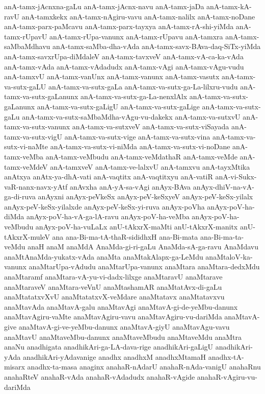 {anA-tamx-jAcnxna-gaLu
anA-tamx-jAcnx-navu
anA-tamx-jaDa
anA-tamx-kA-ravU
anA-tamxkekx
anA-tamx-nAgiru-vavu
anA-tamx-nalilx
anA-tamx-noDane
anA-tamx-parx-paMcavu
anA-tamx-parx-tayxya
anA-tamx-rA-shi-yiMda
anA-tamx-rUpavU
anA-tamx-rUpa-vanunx
anA-tamx-rUpavu
anA-tamxra
anA-tamx-saMbaMdhavu
anA-tamx-saMba-dha-vAda
anA-tamx-savx-BAva-daq-SiTx-yiMda
anA-tamx-savxrUpa-diMdaleV
anA-tamx-tavxveV
anA-tamx-vA-ca-ka-vAda
anA-tamx-vAda
anA-tamx-vAdadudx
anA-tamx-vAgi
anA-tamx-vAgu-vudu
anA-tamxvU
anA-tamx-vanUnx
anA-tamx-vanunx
anA-tamx-vasutx
anA-tamx-va-sutx-gaLU
anA-tamx-va-sutx-gaLa
anA-tamx-va-sutx-ga-La-lilxru-vudu
anA-tamx-va-sutx-gaLanunx
anA-tamx-va-sutx-ga-La-nenxlAlx
anA-tamx-va-sutx-gaLanunx
anA-tamx-va-sutx-gaLigU
anA-tamx-va-sutx-gaLige
anA-tamx-va-sutx-gaLu
anA-tamx-va-sutx-saMbaMdha-vAgu-vu-dakekx
anA-tamx-va-sutxvU
anA-tamx-va-sutx-vanunx
anA-tamx-va-sutxveV
anA-tamx-va-sutx-viSayada
anA-tamx-va-sutx-vigU
anA-tamx-va-sutx-vige
anA-tamx-va-sutx-vina
anA-tamx-va-sutx-vi-naMte
anA-tamx-va-sutx-vi-niMda
anA-tamx-va-sutx-vi-noDane
anA-tamx-veMba
anA-tamx-veMbudu
anA-tamx-veMdathaR
anA-tamx-veMde
anA-tamx-veMdeV
anA-tamxveV
anA-tamx-ve-lalxvU
anA-tamxvu
anA-tayxMtika
anAtxya
anAtx-ya-dhA-vati
anA-vaqtitx
anA-vaqtitxyu
anA-vatiR
anA-vi-Sukx-vaR-nanx-navx-yAtf
anAvxha
anA-yA-sa-vAgi
anAyx-BAva
anAyx-dhiV-na-vA-ga-di-ruva
anAyxni
anAyx-peVkeSx
anAyx-peV-keSxyeV
anAyx-peV-keSx-yilalx
anAyx-peV-keSx-yilalxde
anAyx-peV-keSx-yi-ruva
anAyx-poVha
anAyx-poV-ha-diMda
anAyx-poV-ha-vA-ga-lA-ravu
anAyx-poV-ha-veMba
anAyx-poV-ha-veMbudu
anAyx-poV-ha-vuLaLx
anU-tAkxrX-maMti
anU-tAkxrX-manitx
anU-tAkxrX-muleV
ana
ana-Bi-ma-tA-thaR-sididhxH
ana-Bi-mata
ana-Bi-ma-ta-veMdu
anaH
anaM
anaMdA
AnaMda-gi-ri-gaLu
AnaMda-sA-ga-ravu
AnaMdavu
anaMtAnaMda-yukatx-vAda
anaMta
anaMtakAlapx-ga-LeMdu
anaMtaloV-ka-vanunx
anaMtarUpa-vAdudu
anaMtarUpa-vanunx
anaMtara
anaMtara-dedxMdu
anaMtaramf
anaMtara-vA-yu-vi-dadx-lilxge
anaMtaravU
anaMtarave
anaMtaraveV
anaMtara-veVnU
anaMtashamAR
anaMtatAvx-di-gaLu
anaMtatatxvXvU
anaMtatatxvX-veMdare
anaMtatavx
anaMtatavxvu
anaMtavAda
anaMtavA-galu
anaMtavAgi
anaMtavA-gi-de-yeMbu-danunx
anaMtavAgiru-vaMte
anaMtavAgiru-vavu
anaMtavAgiru-vu-dariMda
anaMtavA-give
anaMtavA-gi-ve-yeMbu-danunx
anaMtavA-giyU
anaMtavAgu-vavu
anaMtavU
anaMtaveMbu-danunx
anaMtaveMbudu
anaMtaveMdu
anaMtra
anaNu
anadhigata
anadhikAri-ga-LA-dava-rige
anadhikAri-gaLigU
anadhikAri-yAda
anadhikAri-yAdavanige
anadhx
anadhxM
anadhxMtamaH
anadhx-tA-misarx
anadhx-ta-masa
anaginx
anahaR-nAdarU
anahaR-nAda-vanigU
anahaRnu
anahaRteV
anahaR-vAda
anahaR-vAdadudx
anahaR-vAgide
anahaR-vAgiru-vu-dariMda
}
